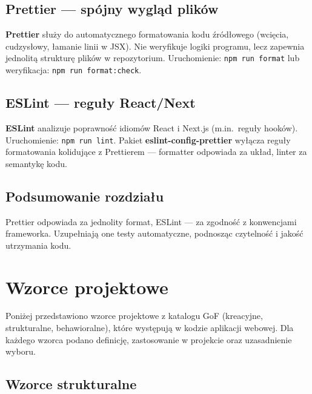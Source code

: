 \documentclass[12pt,a4paper]{report}
\newcommand{\blok}[1]{\needspace{9\baselineskip}#1}
\newenvironment{calosc}{%
  \Needspace{17\baselineskip}%
  \begin{samepage}%
}{%
  \end{samepage}%
}
\begin{document}
\begin{calosc}
\section{Prettier --- spójny wygląd plików}

\textbf{Prettier} służy do automatycznego formatowania kodu źródłowego (wcięcia, cudzysłowy, łamanie linii w JSX). Nie weryfikuje logiki programu, lecz zapewnia jednolitą strukturę plików w repozytorium. Uruchomienie: \texttt{npm run format} lub weryfikacja: \texttt{npm run format:check}.
\end{calosc}

\begin{calosc}
\section{ESLint --- reguły React/Next}

\textbf{ESLint} analizuje poprawność idiomów React i Next.js (m.in.\ reguły hooków). Uruchomienie: \texttt{npm run lint}. Pakiet \textbf{eslint-config-prettier} wyłącza reguły formatowania kolidujące z Prettierem --- formatter odpowiada za układ, linter za semantykę kodu.
\end{calosc}

\begin{calosc}
\section{Podsumowanie rozdziału}

Prettier odpowiada za jednolity format, ESLint --- za zgodność z konwencjami frameworka. Uzupełniają one testy automatyczne, podnosząc czytelność i jakość utrzymania kodu.
\end{calosc}

\chapter{Wzorce projektowe}

\blok{%
Poniżej przedstawiono wzorce projektowe z katalogu GoF (kreacyjne, strukturalne, behawioralne), które występują w kodzie aplikacji webowej. Dla każdego wzorca podano definicję, zastosowanie w projekcie oraz uzasadnienie wyboru.
}

\section{Wzorce strukturalne}
\end{document}
